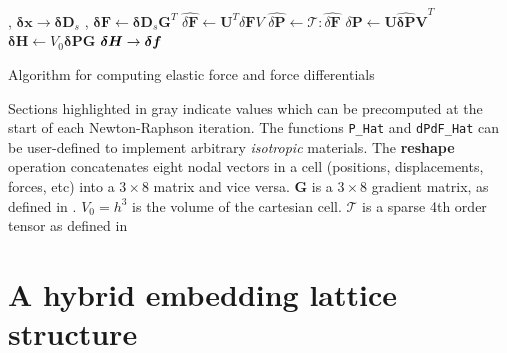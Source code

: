 {\begin{algorithm}[p]
  \begin{minipage}{.5\textwidth}
      \setlength{\baselineskip}{1.35em}
      \begin{algorithmic}[1]
        \State \Reshape {}, $\bm{\delta{}x} \rightarrow \bm{\delta{}D}_s$
        \State \Compute {}, $\bm{\delta{}F} \leftarrow
        \bm{\delta{}D}_s\bm{G}^T$
        \State \Compute {}
        \State \Compute {}
        \State \Compute $\hat{\delta{}\bm{F}} \leftarrow
        \bm{U}^T\delta{}\bm{F}V$
        \State \Compute $\hat{\delta{}\bm{P}}
        \leftarrow \mathcal{T} :
        \hat{\delta{}\bm{F}}$
        \State \Compute $\delta\bm{P} \leftarrow
        \bm{U\hat{\delta{}P}V}^T$
        \State \Set $\bm{\delta{}H} \leftarrow
        V_0\bm{\delta{}PG}$
        \State \Reshape $\bm{\delta{}H} \rightarrow \bm{\delta{}f}\vspace*{-.1in}$
        \EndProcedure
      \end{algorithmic}
      \vspace*{-.1in}
  \end{minipage}
  \caption{Algorithm for computing elastic force and force
    differentials}{Sections highlighted in gray indicate values which
    can be precomputed at the start of each Newton-Raphson
    iteration. The functions \texttt{P\_Hat} and \texttt{dPdF\_Hat}
    can be user-defined to implement arbitrary \emph{isotropic}
    materials. The \textbf{reshape} operation concatenates eight nodal
    vectors in a cell (positions, displacements, forces, etc) into a
    $3\times 8$ matrix and vice versa. $\bm{G}$ is a $3\times 8$
    gradient matrix, as defined in
    \protect\cite{McAdaZSETTS:2011}. $V_0=h^3$ is the volume of the
    cartesian cell. $\mathcal{T}$ is a sparse 4th order tensor as
    defined in \protect\cite{TeranSIF:2005} }
  \label{alg:isotropicforces}
\end{algorithm}
\clearpage
}



\section{A hybrid embedding lattice structure}
\label{sec:hybrid}

